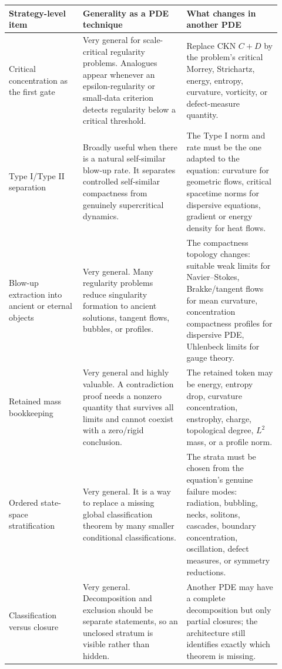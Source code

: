 \documentclass[11pt]{amsart}
\begin{document}
\begin{longtable}{@{}>{\raggedright\arraybackslash}p{0.25\linewidth}>{\raggedright\arraybackslash}p{0.35\linewidth}>{\raggedright\arraybackslash}p{0.32\linewidth}@{}}
\toprule
\textbf{Strategy-level item} & \textbf{Generality as a PDE technique} & \textbf{What changes in another PDE} \\
\midrule
\endhead
Critical concentration as the first gate & Very general for scale-critical regularity problems.  Analogues appear whenever an epsilon-regularity or small-data criterion detects regularity below a critical threshold. & Replace CKN \(C+D\) by the problem's critical Morrey, Strichartz, energy, entropy, curvature, vorticity, or defect-measure quantity. \\
Type I/Type II separation & Broadly useful when there is a natural self-similar blow-up rate.  It separates controlled self-similar compactness from genuinely supercritical dynamics. & The Type I norm and rate must be the one adapted to the equation: curvature for geometric flows, critical spacetime norms for dispersive equations, gradient or energy density for heat flows. \\
Blow-up extraction into ancient or eternal objects & Very general.  Many regularity problems reduce singularity formation to ancient solutions, tangent flows, bubbles, or profiles. & The compactness topology changes: suitable weak limits for Navier--Stokes, Brakke/tangent flows for mean curvature, concentration compactness profiles for dispersive PDE, Uhlenbeck limits for gauge theory. \\
Retained mass bookkeeping & Very general and highly valuable.  A contradiction proof needs a nonzero quantity that survives all limits and cannot coexist with a zero/rigid conclusion. & The retained token may be energy, entropy drop, curvature concentration, enstrophy, charge, topological degree, \(L^2\) mass, or a profile norm. \\
Ordered state-space stratification & Very general.  It is a way to replace a missing global classification theorem by many smaller conditional classifications. & The strata must be chosen from the equation's genuine failure modes: radiation, bubbling, necks, solitons, cascades, boundary concentration, oscillation, defect measures, or symmetry reductions. \\
Classification versus closure & Very general.  Decomposition and exclusion should be separate statements, so an unclosed stratum is visible rather than hidden. & Another PDE may have a complete decomposition but only partial closures; the architecture still identifies exactly which theorem is missing. \\

\end{longtable}
\end{document}
